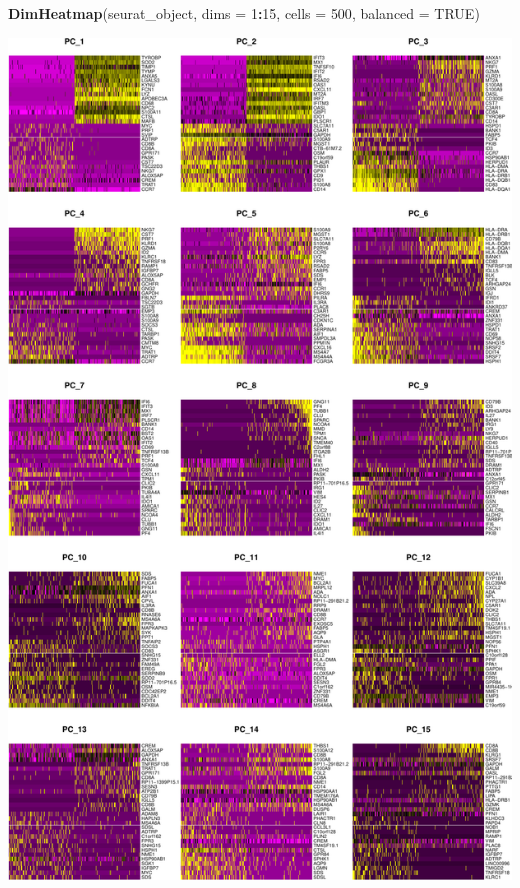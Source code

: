 \documentclass[
]{book}
\newenvironment{Shaded}{\begin{snugshade}}{\end{snugshade}}
\newcommand{\AttributeTok}[1]{\textcolor[rgb]{0.13,0.29,0.53}{#1}}
\newcommand{\ConstantTok}[1]{\textcolor[rgb]{0.56,0.35,0.01}{#1}}
\newcommand{\DecValTok}[1]{\textcolor[rgb]{0.00,0.00,0.81}{#1}}
\newcommand{\FunctionTok}[1]{\textcolor[rgb]{0.13,0.29,0.53}{\textbf{#1}}}
\newcommand{\NormalTok}[1]{#1}
\newcommand{\SpecialCharTok}[1]{\textcolor[rgb]{0.81,0.36,0.00}{\textbf{#1}}}
\begin{document}
\begin{Shaded}
\begin{Highlighting}[]
\FunctionTok{DimHeatmap}\NormalTok{(seurat\_object, }\AttributeTok{dims =} \DecValTok{1}\SpecialCharTok{:}\DecValTok{15}\NormalTok{, }\AttributeTok{cells =} \DecValTok{500}\NormalTok{, }\AttributeTok{balanced =} \ConstantTok{TRUE}\NormalTok{)}
\end{Highlighting}
\end{Shaded}

\includegraphics{scRNAseqInR_ABACBS_2024_Doco_files/figure-latex/multi-heatmap-1.pdf}
\end{document}
